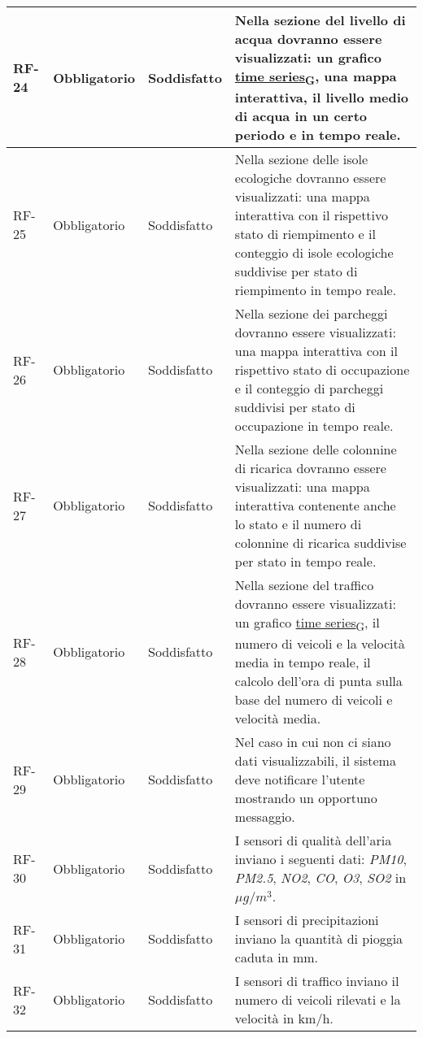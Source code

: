 \begin{longtable}{|>{\centering\arraybackslash}m{}|>{\centering\arraybackslash}m{}|>{\centering\arraybackslash}m{}|>{\centering\arraybackslash}m{}|}
	\\\hline
	RF-24           & Obbligatorio        & Soddisfatto & Nella sezione del livello di acqua dovranno essere visualizzati: un grafico \href{https://7last.github.io/docs/pb/documentazione-interna/glossario\#time-series}{time series\textsubscript{G}}, una mappa interattiva, il livello medio di acqua in un certo periodo e in tempo reale.
	\\\hline
	RF-25           & Obbligatorio        & Soddisfatto & Nella sezione delle isole ecologiche dovranno essere visualizzati: una mappa interattiva con il rispettivo stato di riempimento e il conteggio di isole ecologiche suddivise per stato di riempimento in tempo reale.
	\\\hline
	RF-26           & Obbligatorio        & Soddisfatto & Nella sezione dei parcheggi dovranno essere visualizzati: una mappa interattiva con il rispettivo stato di occupazione e il conteggio di parcheggi suddivisi per stato di occupazione in tempo reale.
	\\\hline
	RF-27           & Obbligatorio        & Soddisfatto & Nella sezione delle colonnine di ricarica dovranno essere visualizzati: una mappa interattiva contenente anche lo stato e il numero di colonnine di ricarica suddivise per stato in tempo reale.
	\\\hline
	RF-28           & Obbligatorio        & Soddisfatto & Nella sezione del traffico dovranno essere visualizzati: un grafico \href{https://7last.github.io/docs/pb/documentazione-interna/glossario\#time-series}{time series\textsubscript{G}}, il numero di veicoli e la velocità media in tempo reale, il calcolo dell'ora di punta sulla base del numero di veicoli e velocità media.
	\\\hline
	RF-29           & Obbligatorio        & Soddisfatto & Nel caso in cui non ci siano dati visualizzabili, il sistema deve notificare l'utente mostrando un opportuno messaggio.
	\\\hline
	RF-30           & Obbligatorio        & Soddisfatto & I sensori di qualità dell'aria inviano i seguenti dati: \textit{PM10}, \textit{PM2.5}, \textit{NO2}, \textit{CO}, \textit{O3}, \textit{SO2} in $\mu g/m^3$.
	\\\hline
	RF-31           & Obbligatorio        & Soddisfatto & I sensori di precipitazioni inviano la quantità di pioggia caduta in mm.
	\\\hline
	RF-32           & Obbligatorio        & Soddisfatto & I sensori di traffico inviano il numero di veicoli rilevati e la velocità in km/h.
	\\\hline

\end{longtable}
